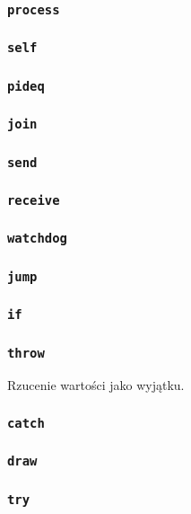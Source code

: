 \subsubsection{\texttt{process}}
\subsubsection{\texttt{self}}
\subsubsection{\texttt{pideq}}
\subsubsection{\texttt{join}}
\subsubsection{\texttt{send}}
\subsubsection{\texttt{receive}}

\subsubsection{\texttt{watchdog}}

\subsubsection{\texttt{jump}}
\subsubsection{\texttt{if}}

\subsubsection{\texttt{throw}}

Rzucenie wartości jako wyjątku.

\subsubsection{\texttt{catch}}
\subsubsection{\texttt{draw}}
\subsubsection{\texttt{try}}
